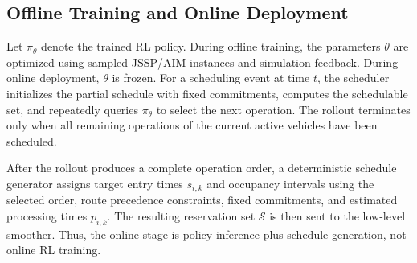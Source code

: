 \begin{figure}[!t]
\centering
{}
\caption{}
\label{fig:relation_aware_gat_policy}
\end{figure}

\subsection{Offline Training and Online Deployment}
\begin{addedtwoblock}
Let $\pi_\theta$ denote the trained RL policy. During offline training, the parameters $\theta$ are optimized using sampled JSSP/AIM instances and simulation feedback. During online deployment, $\theta$ is frozen. For a scheduling event at time $t$, the scheduler initializes the partial schedule with fixed commitments, computes the schedulable set, and repeatedly queries $\pi_\theta$ to select the next operation. The rollout terminates only when all remaining operations of the current active vehicles have been scheduled.

After the rollout produces a complete operation order, a deterministic schedule generator assigns target entry times $s_{i,k}$ and occupancy intervals using the selected order, route precedence constraints, fixed commitments, and estimated processing times $p_{i,k}$. The resulting reservation set $\mathcal{S}$ is then sent to the low-level smoother. Thus, the online stage is policy inference plus schedule generation, not online RL training.
\end{addedtwoblock}

